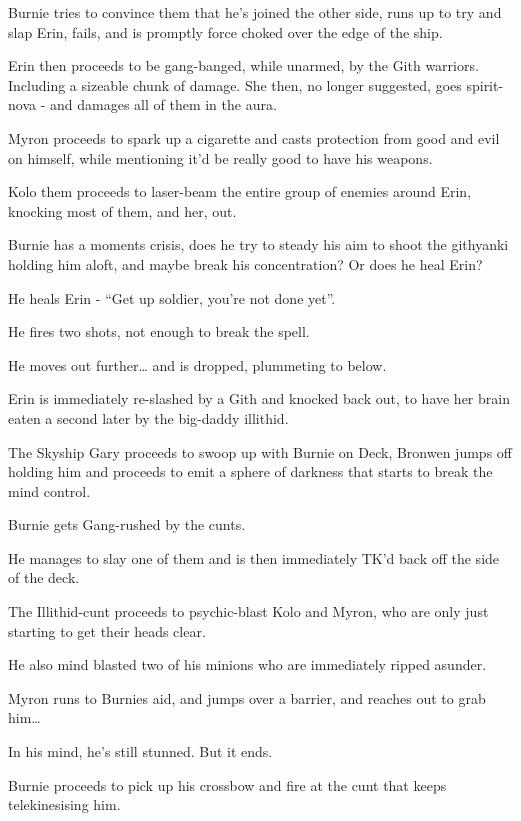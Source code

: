 Burnie tries to convince them that he’s joined the other side, runs up to try and slap Erin, fails, and is promptly force choked over the edge of the ship.\medskip

Erin then proceeds to be gang-banged, while unarmed, by the Gith warriors. Including a sizeable chunk of damage. She then, no longer suggested, goes spirit-nova - and damages all of them in the aura.\medskip

Myron proceeds to spark up a cigarette and casts protection from good and evil on himself, while mentioning it’d be really good to have his weapons.\medskip

Kolo them proceeds to laser-beam the entire group of enemies around Erin, knocking most of them, and her, out.\medskip

Burnie has a moments crisis, does he try to steady his aim to shoot the githyanki holding him aloft, and maybe break his concentration? Or does he heal Erin?\medskip

He heals Erin - “Get up soldier, you’re not done yet”.\medskip

He fires two shots, not enough to break the spell.\medskip

He moves out further… and is dropped, plummeting to below.\medskip

Erin is immediately re-slashed by a Gith and knocked back out, to have her brain eaten a second later by the big-daddy illithid.\medskip

The Skyship Gary proceeds to swoop up with Burnie on Deck, Bronwen jumps off holding him and proceeds to emit a sphere of darkness that starts to break the mind control.\medskip

Burnie gets Gang-rushed by the cunts.\medskip

He manages to slay one of them and is then immediately TK’d back off the side of the deck.\medskip

The Illithid-cunt proceeds to psychic-blast Kolo and Myron, who are only just starting to get their heads clear.\medskip

He also mind blasted two of his minions who are immediately ripped asunder.\medskip

Myron runs to Burnies aid, and jumps over a barrier, and reaches out to grab him…\medskip

In his mind, he’s still stunned. But it ends.\medskip

Burnie proceeds to pick up his crossbow and fire at the cunt that keeps telekinesising him.\medskip

